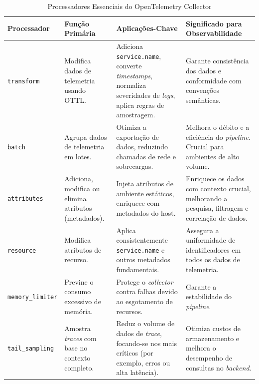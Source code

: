\begin{table}[H]
\centering
\caption{Processadores Essenciais do OpenTelemetry Collector}
\label{tab:processadores_otel_collector}
\begin{tabularx}{\textwidth}{|l|X|X|X|}
\hline
\textbf{Processador} & \textbf{Função Primária} & \textbf{Aplicações-Chave} & \textbf{Significado para Observabilidade} \\
\hline
\texttt{transform} & Modifica dados de telemetria usando OTTL. & Adiciona \texttt{service.name}, converte \textit{timestamps}, normaliza severidades de \textit{logs}, aplica regras de amostragem. & Garante consistência dos dados e conformidade com convenções semânticas. \\
\hline
\texttt{batch} & Agrupa dados de telemetria em lotes. & Otimiza a exportação de dados, reduzindo chamadas de rede e sobrecargas. & Melhora o débito e a eficiência do \textit{pipeline}. Crucial para ambientes de alto volume. \\
\hline
\texttt{attributes} & Adiciona, modifica ou elimina atributos (metadados). & Injeta atributos de ambiente estáticos, enriquece com metadados do host. & Enriquece os dados com contexto crucial, melhorando a pesquisa, filtragem e correlação de dados. \\
\hline
\texttt{resource} & Modifica atributos de recurso. & Aplica consistentemente \texttt{service.name} e outros metadados fundamentais. & Assegura a uniformidade de identificadores em todos os dados de telemetria. \\
\hline
\texttt{memory\_limiter} & Previne o consumo excessivo de memória. & Protege o \textit{collector} contra falhas devido ao esgotamento de recursos. & Garante a estabilidade do \textit{pipeline}. \\
\hline
\texttt{tail\_sampling} & Amostra \textit{traces} com base no contexto completo. & Reduz o volume de dados de \textit{trace}, focando-se nos mais críticos (por exemplo, erros ou alta latência). & Otimiza custos de armazenamento e melhora o desempenho de consultas no \textit{backend}. \\
\hline
\end{tabularx}
\end{table}



